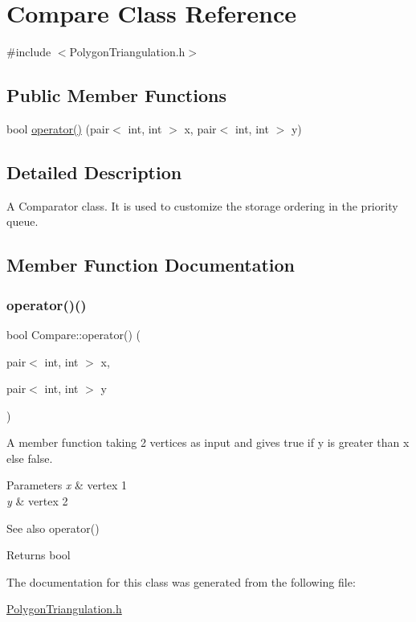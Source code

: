 \hypertarget{class_compare}{}\section{Compare Class Reference}
\label{class_compare}


{\ttfamily \#include $<$Polygon\+Triangulation.\+h$>$}

\subsection*{Public Member Functions}
\begin{DoxyCompactItemize}
\item 
bool \hyperlink{class_compare_a0243325463ea885a0f691bf6e0e23cf4}{operator()} (pair$<$ int, int $>$ x, pair$<$ int, int $>$ y)
\end{DoxyCompactItemize}


\subsection{Detailed Description}
A Comparator class. It is used to customize the storage ordering in the priority queue. 

\subsection{Member Function Documentation}
\mbox{\label{class_compare_a0243325463ea885a0f691bf6e0e23cf4}} 
\subsubsection{\texorpdfstring{operator()()}{operator()()}}
{\footnotesize\ttfamily bool Compare\+::operator() (\begin{DoxyParamCaption}\item[{pair$<$ int, int $>$}]{x,  }\item[{pair$<$ int, int $>$}]{y }\end{DoxyParamCaption})\hspace{0.3cm}{\ttfamily [inline]}}

A member function taking 2 vertices as input and gives true if y is greater than x else false. 
\begin{DoxyParams}{Parameters}
{\em x} & vertex 1 \\
\hline
{\em y} & vertex 2 \\
\hline
\end{DoxyParams}
\begin{DoxySeeAlso}{See also}
operator() 
\end{DoxySeeAlso}
\begin{DoxyReturn}{Returns}
bool 
\end{DoxyReturn}


The documentation for this class was generated from the following file\+:\begin{DoxyCompactItemize}
\item 
\hyperlink{_polygon_triangulation_8h}{Polygon\+Triangulation.\+h}\end{DoxyCompactItemize}
